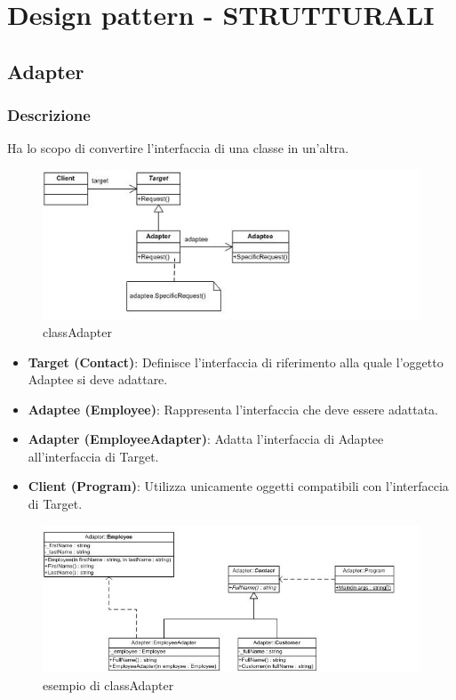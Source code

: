\documentclass[a4paper,10pt]{article}
\begin{document}
    
    \tableofcontents	%
    \newpage
    
    \section{Design pattern - STRUTTURALI}

    \subsection{Adapter}
    \subsubsection{Descrizione}

    Ha lo scopo di convertire l'interfaccia di una classe in un'altra.
    
    \begin{figure}[h!] %
        \centering
        \includegraphics[scale=1]{img/IC104742}	
        \caption{classAdapter}
    \end{figure}

    \begin{itemize}
        \item \textbf{Target (Contact)}: Definisce l’interfaccia di riferimento alla quale l’oggetto Adaptee si deve adattare.
        \item \textbf{Adaptee (Employee)}: Rappresenta l’interfaccia che deve essere adattata.
        \item \textbf{Adapter (EmployeeAdapter)}: Adatta l’interfaccia di Adaptee all’interfaccia di Target.
        \item \textbf{Client (Program)}: Utilizza unicamente oggetti compatibili con l’interfaccia di Target.
    \end{itemize}
    
    \begin{figure}[h!] %
        \centering
        \includegraphics[scale=0.65]{img/IC53435}	
        \caption{esempio di classAdapter}
    \end{figure}
    \newpage
\end{document}
